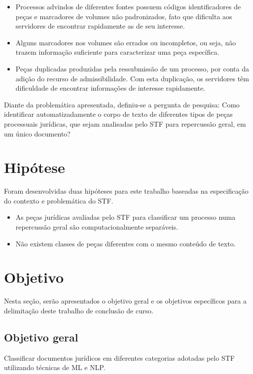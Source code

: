 \begin{itemize}
	\item Processos advindos de diferentes fontes possuem códigos identificadores de peças e marcadores de volumes não padronizados, fato que dificulta aos servidores de encontrar rapidamente as de seu interesse.
    \item Alguns marcadores nos volumes são errados ou incompletos, ou seja, não trazem informação suficiente para caracterizar uma peça específica.
    \item Peças duplicadas produzidas pela ressubmissão de um processo, por conta da adição do recurso de admissibilidade. Com esta duplicação, os servidores têm dificuldade de encontrar informações de interesse rapidamente.
\end{itemize}

Diante da problemática apresentada, definiu-se a pergunta de pesquisa: Como identificar automatizadamente o corpo de texto de diferentes tipos de peças processuais jurídicas, que sejam analisadas pelo STF para repercussão geral, em um único documento?

\section{Hipótese}\label{sec:hipotese}

Foram desenvolvidas duas hipóteses \cite{gil_como_2002} para este trabalho baseadas na especificação do contexto e problemática do STF. 

\begin{itemize}
	\item As peças jurídicas avaliadas pelo STF para classificar um processo numa repercussão geral são computacionalmente separáveis.
    \item Não existem classes de peças diferentes com o mesmo conteúdo de texto.
\end{itemize}

\section{Objetivo}
Nesta seção, serão apresentados o objetivo geral e os objetivos específicos para a delimitação deste trabalho de conclusão de curso.

\subsection{Objetivo geral}

Classificar documentos jurídicos em diferentes categorias adotadas pelo STF utilizando técnicas de ML e NLP.

